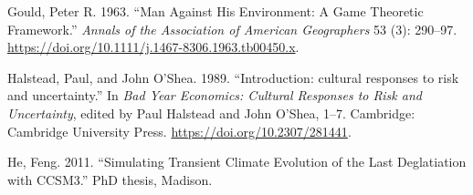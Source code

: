 \documentclass[smallextended]{svjour3}       %
\begin{document}
\leavevmode\hypertarget{ref-GOULD1963a}{}%
Gould, Peter R. 1963. ``Man Against His Environment: A Game Theoretic
Framework.'' \emph{Annals of the Association of American Geographers} 53
(3): 290--97. \url{https://doi.org/10.1111/j.1467-8306.1963.tb00450.x}.

\leavevmode\hypertarget{ref-Halstead1989}{}%
Halstead, Paul, and John O'Shea. 1989. ``Introduction: cultural
responses to risk and uncertainty.'' In \emph{Bad Year Economics:
Cultural Responses to Risk and Uncertainty}, edited by Paul Halstead and
John O'Shea, 1--7. Cambridge: Cambridge University Press.
\url{https://doi.org/10.2307/281441}.

\leavevmode\hypertarget{ref-He2011}{}%
He, Feng. 2011. ``Simulating Transient Climate Evolution of the Last
Deglatiation with CCSM3.'' PhD thesis, Madison.



\end{document}
